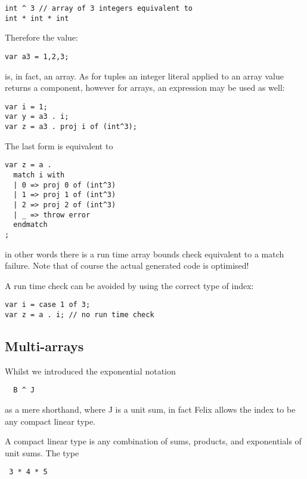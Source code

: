 \documentclass[oneside]{book}
\begin{document}
\begin{verbatim}
int ^ 3 // array of 3 integers equivalent to
int * int * int
\end{verbatim}

Therefore the value:

\begin{verbatim}
var a3 = 1,2,3;
\end{verbatim}

is, in fact, an array. As for tuples an integer literal applied
to an array value returns a component, however for arrays,
an expression may be used as well:

\begin{verbatim}
var i = 1;
var y = a3 . i;
var z = a3 . proj i of (int^3);
\end{verbatim}

The last form is equivalent to

\begin{verbatim}
var z = a . 
  match i with
  | 0 => proj 0 of (int^3)
  | 1 => proj 1 of (int^3)
  | 2 => proj 2 of (int^3)
  | _ => throw error
  endmatch
;
\end{verbatim}

in other words there is a run time array bounds check equivalent to a match failure.
Note that of course the actual generated code is optimised!

A run time check can be avoided by using the correct type of index:

\begin{verbatim}
var i = case 1 of 3;
var z = a . i; // no run time check
\end{verbatim}


\subsection{Multi-arrays}
Whilst we introduced the exponential notation

\begin{verbatim}
  B ^ J
\end{verbatim}

as a mere shorthand, where J is a unit sum, in fact Felix allows
the index to be any compact linear type.

A compact linear type is any combination of sums, products,
and exponentials of unit sums. The type

\begin{verbatim}
 3 * 4 * 5
\end{verbatim}
\end{document}
